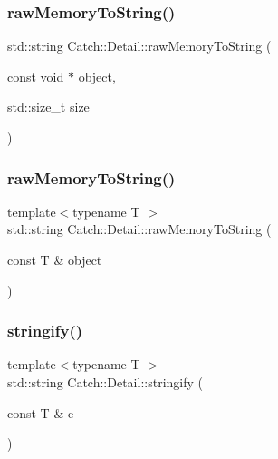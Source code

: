 \mbox{\label{namespace_catch_1_1_detail_ac5d6c510e565ee5bddcc2236194ce29e}} 
\subsubsection{\texorpdfstring{rawMemoryToString()}{rawMemoryToString()}\hspace{0.1cm}{\footnotesize\ttfamily [1/2]}}
{\footnotesize\ttfamily std\+::string Catch\+::\+Detail\+::raw\+Memory\+To\+String (\begin{DoxyParamCaption}\item[{const void $\ast$}]{object,  }\item[{std\+::size\+\_\+t}]{size }\end{DoxyParamCaption})}

\mbox{\label{namespace_catch_1_1_detail_a371620ed524abfcae5c3772bf49b563a}} 
\subsubsection{\texorpdfstring{rawMemoryToString()}{rawMemoryToString()}\hspace{0.1cm}{\footnotesize\ttfamily [2/2]}}
{\footnotesize\ttfamily template$<$typename T $>$ \\
std\+::string Catch\+::\+Detail\+::raw\+Memory\+To\+String (\begin{DoxyParamCaption}\item[{const T \&}]{object }\end{DoxyParamCaption})}

\mbox{\label{namespace_catch_1_1_detail_af0ad48344ffd3f92f3568465248a9880}} 
\subsubsection{\texorpdfstring{stringify()}{stringify()}}
{\footnotesize\ttfamily template$<$typename T $>$ \\
std\+::string Catch\+::\+Detail\+::stringify (\begin{DoxyParamCaption}\item[{const T \&}]{e }\end{DoxyParamCaption})}



